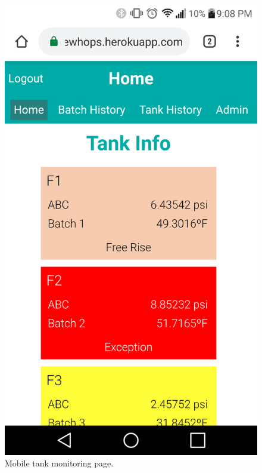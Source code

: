 \documentclass[draftclsnofoot,onecolumn,journal,letterpaper,compsoc,10pt]{IEEEtran}
\begin{document}
\begin{figure}[H]
    \centering
    \includegraphics[height=0.4\textheight]{screenshots/progress_report_screencap-mobile_tank_monitoring.png}
    \caption{Mobile tank monitoring page.}
\end{figure}
\end{document}
